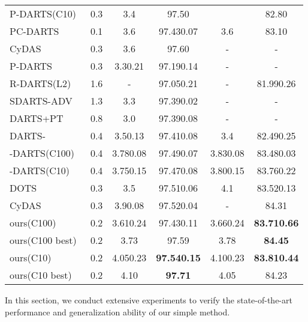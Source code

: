 \documentclass[10pt,twocolumn,letterpaper]{article}
\begin{document}
\begin{table}
{\begin{tabular}{lccccc}
    P-DARTS(C10)~\cite{Chen_2019_pdarts}           & 0.3           &     3.4       & 97.50           &               & 82.80             \\
    PC-DARTS\cite{Xu2020PC-DARTS}               & 0.1           &     3.6       & 97.430.07  & 3.6           & 83.10             \\
    CyDAS~\cite{Yu_2022_cdarts}                  & 0.3           &     3.6       & 97.60           & -             & -                 \\  
    \midrule
    P-DARTS~\cite{Chen_2019_pdarts}                & 0.3           & 3.30.21  & 97.190.14  & -             & -                 \\
    R-DARTS(L2)~\cite{Zela2020Understanding}            & 1.6           & -             & 97.050.21  & -             & 81.990.26    \\
    SDARTS-ADV~\cite{chen_2020_sdarts}             & 1.3           & 3.3           & 97.390.02  & -             & -                 \\
    DARTS+PT~\cite{wang_2021_rethinking}               & 0.8           & 3.0           & 97.390.08  & -             & -                 \\
    DARTS-~\cite{chu2021dartsminus}                 & 0.4           & 3.50.13  & 97.410.08  & 3.4           & 82.490.25    \\
    -DARTS(C100)~\cite{ye_2022_beta}    & 0.4           & 3.780.08 & 97.490.07  & 3.830.08 & 83.480.03    \\
    -DARTS(C10)~\cite{ye_2022_beta}     & 0.4           & 3.750.15 & 97.470.08  & 3.800.15 & 83.760.22    \\
    DOTS~\cite{Gu_2021_dots}                   & 0.3           & 3.5           & 97.510.06  & 4.1           & 83.520.13    \\
    CyDAS~\cite{Yu_2022_cdarts}                  & 0.3           & 3.90.08  & 97.520.04  & -             & 84.31              \\    
    \midrule
    ours(C100)             & 0.2           & 3.610.24 & 97.430.11  & 3.660.24 & \textbf{83.710.66} \\
    ours(C100 best)        & 0.2           & 3.73          & 97.59           & 3.78          & \textbf{84.45}                  \\  
    ours(C10)              & 0.2           & 4.050.23 & \textbf{97.540.15} & 4.100.23 & \textbf{83.810.44}  \\
    ours(C10 best)         & 0.2           & 4.10          & \textbf{97.71}            & 4.05          & 84.23              \\  
    \bottomrule
  \end{tabular}
  }
\label{tab:results_c10andc100}
\vspace{-6pt}
\end{table} In this section, we conduct extensive experiments to verify the state-of-the-art performance and generalization ability of our simple method.
\end{document}
